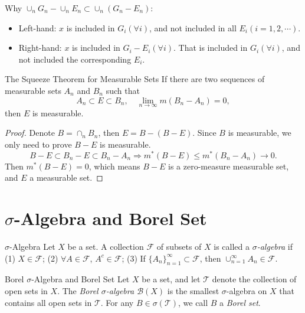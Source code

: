 \begin{note}
  Why $\cup_n G_n - \cup_n E_n \subset \cup_n (G_n - E_n)$:
  \begin{itemize}
  \item Left-hand: $x$ is included in $G_i(\forall i)$, and not included in all $E_i(i=1,2,\cdots)$.
  \item Right-hand: $x$ is included in $G_i - E_i(\forall i)$.
    That is included in $G_i (\forall i)$, and not included the corresponding $E_i$.
  \end{itemize}
\end{note}

\begin{theorem}{The Squeeze Theorem for Measurable Sets}{}
  If there are two sequences of measurable sets $A_n$ and $B_n$ such that
  \begin{equation}
    A_n \subset E \subset B_n, \quad \lim \limits _{n \rightarrow \infty} m(B_n - A_n) = 0,
  \end{equation}
  then $E$ is measurable.
\end{theorem}

\begin{proof}
  Denote $B = \cap _n B_n$, then $E = B - (B - E)$.
  Since $B$ is measurable, we only need to prove $B - E$ is measurable.
  \begin{equation}
    B - E \subset B_n - E \subset B_n - A_n \Rightarrow m^{\ast}(B - E) \leq m^{\ast}(B_n - A_n) \rightarrow 0.
  \end{equation}
  Then $m^{\ast}(B - E) = 0$, which means $B - E$ is a zero-measure measurable set,
  and $E$ a measurable set.
\end{proof}

\section{$\sigma$-Algebra and Borel Set}

\begin{definition}{$\sigma$-Algebra}{}
  Let $X$ be a set. A collection $\mathcal{F}$ of subsets of $X$ is called a
  \emph{$\sigma$-algebra} if
  (1) $X \in \mathcal{F}$;
  (2) $\forall A \in \mathcal{F}$, $A^c \in \mathcal{F}$;
  (3) If $\{A_n\}_{n=1}^{\infty} \subset \mathcal{F}$, then $\cup _{n = 1}^{\infty} A_n \in \mathcal{F}$.
\end{definition}

\begin{definition}{Borel $\sigma$-Algebra and Borel Set}{}
  Let $X$ be a set,
  and let $\mathcal{T}$ denote the collection of open sets in $X$.
  The \emph{Borel $\sigma$-algebra $\mathcal{B}(X)$} is the smallest $\sigma$-algebra
  on $X$ that contains all open sets in $\mathcal{T}$.
  For any $B \in \sigma(\mathcal{T})$,
  we call $B$ a \emph{Borel set}.
\end{definition}




